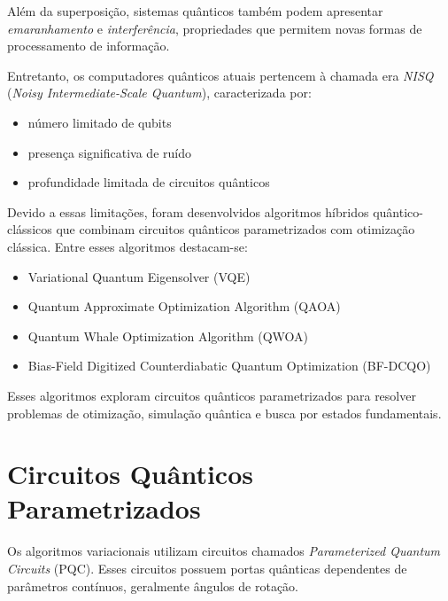 \documentclass[a4paper,12pt]{article}
\begin{document}
Além da superposição, sistemas quânticos também podem apresentar \colorbox{red!20}{\textit{emaranhamento}}
e \colorbox{red!20}{\textit{interferência}}, propriedades que permitem novas formas de processamento 
de informação.

Entretanto, os \colorbox{blue!20}{computadores quânticos atuais pertencem à chamada era \textit{NISQ}} 
(\textit{Noisy Intermediate-Scale Quantum}), caracterizada por:

\begin{itemize}
\item número limitado de qubits
\item presença significativa de ruído
\item profundidade limitada de circuitos quânticos
\end{itemize}

Devido a essas \colorbox{red!20}{limitações}, foram desenvolvidos \colorbox{blue!20}{algoritmos híbridos quântico-clássicos}
que combinam \colorbox{blue!20}{circuitos quânticos parametrizados} com \colorbox{green!20}{otimização clássica}. 
Entre esses algoritmos destacam-se:

\begin{itemize}
\item \colorbox{yellow!30}{Variational Quantum Eigensolver (VQE)}
\item \colorbox{yellow!30}{Quantum Approximate Optimization Algorithm (QAOA)}
\item \colorbox{yellow!30}{Quantum Whale Optimization Algorithm (QWOA)}
\item \colorbox{yellow!30}{Bias-Field Digitized Counterdiabatic Quantum Optimization (BF-DCQO)}
\end{itemize}

Esses \colorbox{green!20}{algoritmos exploram circuitos quânticos parametrizados} para resolver problemas 
de \colorbox{green!20}{otimização, simulação quântica e busca por estados fundamentais.}

\section{Circuitos Quânticos Parametrizados}

Os algoritmos variacionais utilizam circuitos chamados \colorbox{blue!20}{\textit{Parameterized 
Quantum Circuits}} (PQC). Esses circuitos possuem \colorbox{blue!20}{portas quânticas dependentes de 
parâmetros contínuos}, geralmente \colorbox{blue!20}{ângulos de rotação}.
\end{document}
